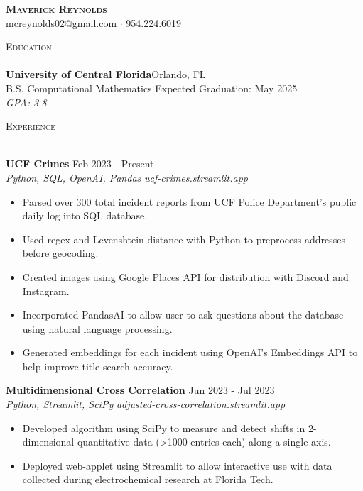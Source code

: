 \documentclass[letterpaper]{article}
\newcommand{\lineunder} {
    \vspace*{-8pt} \\
    \hspace*{-18pt} \hrulefill \\
}
\newcommand{\header} [1] {
    {\hspace*{-18pt}\vspace*{12pt} \large\textsc{#1}}
    \vspace*{-12pt} \lineunder
}
\begin{document}
\vspace*{-25pt}
    

\vspace*{-10pt}
\begin{center}
	{\Huge \scshape \textbf {Maverick Reynolds}}\\
	mcreynolds02@gmail.com $\cdot$ 954.224.6019\\
\end{center}


\header{Education}
\textbf{University of Central Florida}\hfill Orlando, FL\\
B.S. Computational Mathematics \hfill Expected Graduation: May 2025\\
\hspace{7mm} \textit{GPA: 3.8}\\
\vspace{3mm}


\header{Experience}
\vspace{1mm}

\textbf{UCF Crimes} \hfill Feb 2023 - Present \\
\textit{Python, SQL, OpenAI, Pandas} \hfill \textit{ucf-crimes.streamlit.app}\\
\vspace{-1mm}
\begin{itemize} \itemsep 1pt
	\item Parsed over 300 total incident reports from UCF Police Department's public daily log into SQL database.
	\item Used regex and Levenshtein distance with Python to preprocess addresses before geocoding.
	\item Created images using Google Places API for distribution with Discord and Instagram.
	\item Incorporated PandasAI to allow user to ask questions about the database using natural language processing.
	\item Generated embeddings for each incident using OpenAI's Embeddings API to help improve title search accuracy.
\end{itemize}

\textbf{Multidimensional Cross Correlation} \hfill Jun 2023 - Jul 2023 \\
\textit{Python, Streamlit, SciPy} \hfill \textit{adjusted-cross-correlation.streamlit.app}\\
\vspace{-1mm}
\begin{itemize} \itemsep 1pt
	\item Developed algorithm using SciPy to measure and detect shifts in 2-dimensional quantitative data (>1000 entries each) along a single axis.
	\item Deployed web-applet using Streamlit to allow interactive use with data collected during electrochemical research at Florida Tech.
\end{itemize}
\end{document}
